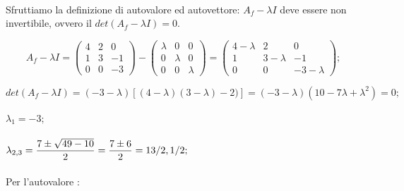 \documentclass[a4paper]{report}
\begin{document}
        \paragraph{}
        Sfruttiamo la definizione di autovalore ed autovettore:
        $A_{f} - \lambda I$ deve essere non invertibile,
        ovvero il $det(A_{f} - \lambda I) = 0$.

        \[
                A_{f} -\lambda I = \begin{pmatrix}
                        4 & 2 & 0 \\
                        1 & 3 & -1 \\
                        0 & 0 & -3
                \end{pmatrix} - \begin{pmatrix}
                        \lambda & 0       & 0 \\
                        0       & \lambda & 0 \\
                        0       & 0       & \lambda
                \end{pmatrix} = \begin{pmatrix}
                        4 - \lambda & 2 & 0 \\
                        1 & 3 - \lambda & -1 \\
                        0 & 0 & -3 - \lambda
                \end{pmatrix};
        \]

        \[
                det(A_{f} - \lambda I) = (- 3 - \lambda) [ (4 - \lambda) (3 - \lambda) - 2) ] = (- 3 - \lambda) (10 - 7 \lambda + \lambda^{2}) = 0 ;
        \]

        \paragraph{}
        $
                \lambda_{1} = - 3;
        $

        \paragraph{}
        $
                \lambda_{2,3} = \mathlarger{\frac{7 \pm \sqrt{49 - 10 }}{2}} = \mathlarger{\frac{7 \pm 6}{2}} = 13/2, 1/2;
        $

        \paragraph{}
        Per l'autovalore :
\end{document}
